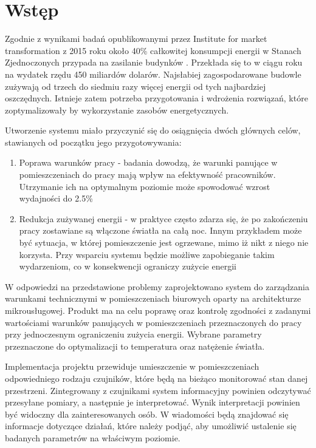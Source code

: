 \newpage %
\section{Wstęp}

Zgodnie z wynikami badań opublikowanymi przez Institute for market transformation z 
2015 roku około 40\% całkowitej konsumpcji energii w Stanach Zjednoczonych przypada na zasilanie budynków 
\cite{Imt.org2015}. Przekłada się to w ciągu roku na wydatek rzędu 450 miliardów 
dolarów. Najsłabiej zagospodarowane budowle zużywają od trzech do siedmiu razy więcej 
energii od tych najbardziej oszczędnych. Istnieje zatem potrzeba przygotowania 
i wdrożenia rozwiązań, które zoptymalizowały by wykorzystanie zasobów energetycznych. 

Utworzenie systemu miało przyczynić się do osiągnięcia dwóch głównych 
celów, stawianych od początku jego przygotowywania:

\begin{enumerate}
    \item Poprawa warunków pracy - badania \cite{oseland2012} dowodzą, że 
    warunki panujące w pomieszczeniach do pracy mają wpływ na efektywność pracowników. 
    Utrzymanie ich na optymalnym poziomie może spowodować wzrost wydajności do 2.5\%
    \item Redukcja zużywanej energii - w praktyce często zdarza się, że po zakończeniu 
    pracy zostawiane są włączone światła na całą noc. Innym przykładem może być 
    sytuacja, w której pomieszczenie jest ogrzewane, mimo iż nikt z niego nie korzysta. 
    Przy wsparciu systemu będzie możliwe zapobieganie takim wydarzeniom, co w 
    konsekwencji ograniczy zużycie energii
\end{enumerate}

W odpowiedzi na przedstawione problemy zaprojektowano system do 
zarządzania warunkami technicznymi w pomieszczeniach biurowych oparty na architekturze 
mikrousługowej. Produkt ma na celu poprawę oraz kontrolę zgodności z zadanymi 
wartościami warunków panujących w pomieszczeniach 
przeznaczonych do pracy przy jednoczesnym ograniczeniu zużycia energii. 
Wybrane parametry przeznaczone do optymalizacji to temperatura oraz natężenie światła.

Implementacja projektu przewiduje umieszczenie w pomieszczeniach odpowiedniego 
rodzaju czujników, które będą na bieżąco monitorować stan danej przestrzeni. 
Zintegrowany z czujnikami system informacyjny powinien odczytywać przesyłane 
pomiary, a następnie je interpretować. Wynik interpretacji powinien być widoczny dla 
zainteresowanych osób. W wiadomości będą znajdować się informacje dotyczące 
działań, które należy podjąć, aby umożliwić ustalenie się badanych parametrów na 
właściwym poziomie.

